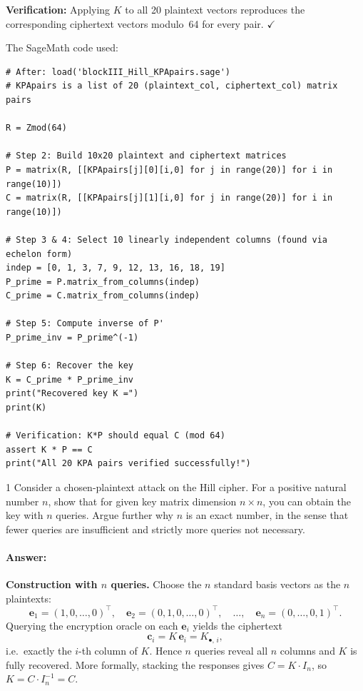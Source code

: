 \documentclass[]{scrartcl}
\newcounter{exercise}
\newcounter{qid}[section]
\newcommand{\exerciseprefix}{prefix}
\newcommand{\questiontitle}{Questions}
\newcommand{\blockid}{B3}
\newcommand{\exname}{}
\begin{document}
\textbf{Verification:} Applying $K$ to all 20 plaintext vectors reproduces the corresponding ciphertext vectors modulo~64 for every pair. $\checkmark$

\medskip
The SageMath code used:

\begin{lstlisting}[style=sageStyle, caption={Known-plaintext attack on Hill cipher over $\mathbb{Z}_{64}$}]
# After: load('blockIII_Hill_KPApairs.sage')
# KPApairs is a list of 20 (plaintext_col, ciphertext_col) matrix pairs

R = Zmod(64)

# Step 2: Build 10x20 plaintext and ciphertext matrices
P = matrix(R, [[KPApairs[j][0][i,0] for j in range(20)] for i in range(10)])
C = matrix(R, [[KPApairs[j][1][i,0] for j in range(20)] for i in range(10)])

# Step 3 & 4: Select 10 linearly independent columns (found via echelon form)
indep = [0, 1, 3, 7, 9, 12, 13, 16, 18, 19]
P_prime = P.matrix_from_columns(indep)
C_prime = C.matrix_from_columns(indep)

# Step 5: Compute inverse of P'
P_prime_inv = P_prime^(-1)

# Step 6: Recover the key
K = C_prime * P_prime_inv
print("Recovered key K =")
print(K)

# Verification: K*P should equal C (mod 64)
assert K * P == C
print("All 20 KPA pairs verified successfully!")
\end{lstlisting}


\renewcommand{\exerciseprefix}{PS-\blockid{}-E\theexercise: \exname-Q\theqid}
\renewcommand{\questiontitle}{\exerciseprefix{}: Chosen-plaintext attack}
\begin{exercisebox}{1}
Consider a chosen-plaintext attack on the Hill cipher. For a positive natural number $n$, show that for given key matrix dimension $n \times n$, you can obtain the key with $n$ queries. Argue further why $n$ is an exact number, in the sense that fewer queries are insufficient and strictly more queries not necessary. 

\end{exercisebox}

\paragraph{Answer:}

\textbf{Construction with $n$ queries.}
Choose the $n$ standard basis vectors as the $n$ plaintexts:
\[
\mathbf{e}_1 = (1,0,\ldots,0)^\top,\quad
\mathbf{e}_2 = (0,1,0,\ldots,0)^\top,\quad \ldots,\quad
\mathbf{e}_n = (0,\ldots,0,1)^\top.
\]
Querying the encryption oracle on each $\mathbf{e}_i$ yields the ciphertext
\[
\mathbf{c}_i = K\,\mathbf{e}_i = K_{\bullet,\,i},
\]
i.e.\ exactly the $i$-th column of $K$. Hence $n$ queries reveal all $n$ columns and $K$ is fully recovered. More formally, stacking the responses gives $C = K\cdot I_n$, so $K = C\cdot I_n^{-1} = C$.
\end{document}
